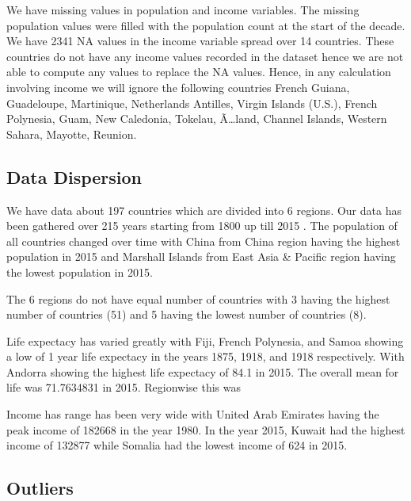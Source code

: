 \documentclass[]{article}
\begin{document}
We have missing values in population and income variables. The missing
population values were filled with the population count at the start of
the decade. We have 2341 NA values in the income variable spread over 14
countries. These countries do not have any income values recorded in the
dataset hence we are not able to compute any values to replace the NA
values. Hence, in any calculation involving income we will ignore the
following countries French Guiana, Guadeloupe, Martinique, Netherlands
Antilles, Virgin Islands (U.S.), French Polynesia, Guam, New Caledonia,
Tokelau, Ã\ldots{}land, Channel Islands, Western Sahara, Mayotte,
Reunion.

\hypertarget{data-dispersion}{%
\subsection{Data Dispersion}\label{data-dispersion}}

We have data about 197 countries which are divided into 6 regions. Our
data has been gathered over 215 years starting from 1800 up till 2015 .
The population of all countries changed over time with China from China
region having the highest population in 2015 and Marshall Islands from
East Asia \& Pacific region having the lowest population in 2015.

The 6 regions do not have equal number of countries with 3 having the
highest number of countries (51) and 5 having the lowest number of
countries (8).

Life expectacy has varied greatly with Fiji, French Polynesia, and Samoa
showing a low of 1 year life expectacy in the years 1875, 1918, and 1918
respectively. With Andorra showing the highest life expectacy of 84.1 in
2015. The overall mean for life was 71.7634831 in 2015. Regionwise this
was

Income has range has been very wide with United Arab Emirates having the
peak income of 182668 in the year 1980. In the year 2015, Kuwait had the
highest income of 132877 while Somalia had the lowest income of 624 in
2015.

\hypertarget{outliers}{%
\subsection{Outliers}\label{outliers}}
\end{document}
